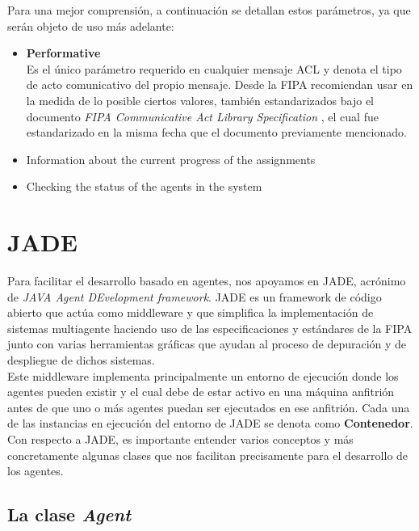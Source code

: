 Para una mejor comprensión, a continuación se detallan estos parámetros, ya que serán objeto de uso más adelante:\\

\begin{itemize}
	\item \textbf{Performative}\\
	Es el único parámetro requerido en cualquier mensaje ACL y denota el tipo de acto comunicativo del propio mensaje. Desde la FIPA recomiendan usar en la medida de lo posible ciertos valores, también estandarizados bajo el documento \textit{FIPA Communicative Act Library Specification} \cite{unknown-author-2002B}, el cual fue estandarizado en la misma fecha que el documento previamente mencionado.
	\item Information about the current progress of the assignments
	\item Checking the status of the agents in the system
\end{itemize}

\section{JADE}

Para facilitar el desarrollo basado en agentes, nos apoyamos en JADE, acrónimo de \textit{JAVA Agent DEvelopment framework}. JADE es un framework de código abierto que actúa como middleware y que simplifica la implementación de sistemas multiagente haciendo uso de las especificaciones y estándares de la FIPA junto con varias herramientas gráficas que ayudan al proceso de depuración y de despliegue de dichos sistemas.\\

Este middleware implementa principalmente un entorno de ejecución donde los agentes pueden existir y el cual debe de estar activo en una máquina anfitrión antes de que uno o más agentes puedan ser ejecutados en ese anfitrión. Cada una de las instancias en ejecución del entorno de JADE se denota como \textbf{Contenedor}.\\

Con respecto a JADE, es importante entender varios conceptos y más concretamente algunas clases que nos facilitan precisamente para el desarrollo de los agentes.\\

\subsection{La clase \textit{Agent}}


